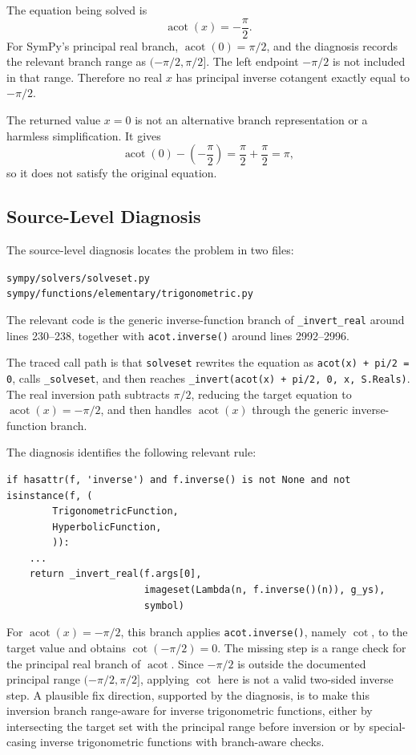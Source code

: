 \documentclass[11pt]{article}
\begin{document}
The equation being solved is
\[
  \operatorname{acot}(x) = -\frac{\pi}{2}.
\]
For SymPy's principal real branch, \(\operatorname{acot}(0)=\pi/2\), and the diagnosis records the relevant branch range as \((-\pi/2,\pi/2]\). The left endpoint \(-\pi/2\) is not included in that range. Therefore no real \(x\) has principal inverse cotangent exactly equal to \(-\pi/2\).

The returned value \(x=0\) is not an alternative branch representation or a harmless simplification. It gives
\[
  \operatorname{acot}(0) - \left(-\frac{\pi}{2}\right)
  = \frac{\pi}{2}+\frac{\pi}{2}
  = \pi,
\]
so it does not satisfy the original equation.

\subsection{Source-Level Diagnosis}

The source-level diagnosis locates the problem in two files:
\begin{center}
\nolinkurl{sympy/solvers/solveset.py}\\
\nolinkurl{sympy/functions/elementary/trigonometric.py}
\end{center}
The relevant code is the generic inverse-function branch of \texttt{\_invert\_real} around lines 230--238, together with \texttt{acot.inverse()} around lines 2992--2996.

The traced call path is that \texttt{solveset} rewrites the equation as \texttt{acot(x) + pi/2 = 0}, calls \texttt{\_solveset}, and then reaches \texttt{\_invert(acot(x) + pi/2, 0, x, S.Reals)}. The real inversion path subtracts \(\pi/2\), reducing the target equation to \(\operatorname{acot}(x)=-\pi/2\), and then handles \(\operatorname{acot}(x)\) through the generic inverse-function branch.

The diagnosis identifies the following relevant rule:

\begin{lstlisting}[style=bugpython]
if hasattr(f, 'inverse') and f.inverse() is not None and not isinstance(f, (
        TrigonometricFunction,
        HyperbolicFunction,
        )):
    ...
    return _invert_real(f.args[0],
                        imageset(Lambda(n, f.inverse()(n)), g_ys),
                        symbol)
\end{lstlisting}

For \(\operatorname{acot}(x)=-\pi/2\), this branch applies \texttt{acot.inverse()}, namely \(\cot\), to the target value and obtains \(\cot(-\pi/2)=0\). The missing step is a range check for the principal real branch of \(\operatorname{acot}\). Since \(-\pi/2\) is outside the documented principal range \((-\pi/2,\pi/2]\), applying \(\cot\) here is not a valid two-sided inverse step. A plausible fix direction, supported by the diagnosis, is to make this inversion branch range-aware for inverse trigonometric functions, either by intersecting the target set with the principal range before inversion or by special-casing inverse trigonometric functions with branch-aware checks.
\end{document}
